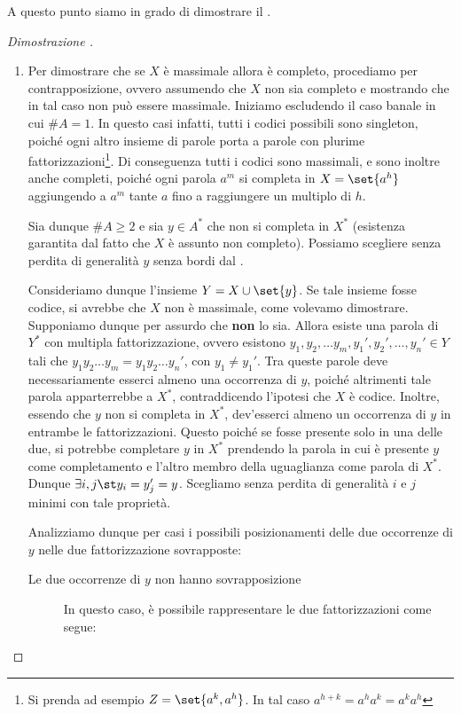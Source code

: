 A questo punto siamo in grado di dimostrare il .
\begin{proof}[Dimostrazione ]
  \begin{enumerate}
    \item Per dimostrare che se \(X\) è massimale allora è completo, procediamo per contrapposizione, ovvero assumendo che \(X\) non sia completo e mostrando che in tal caso non può essere massimale.
      Iniziamo escludendo il caso banale in cui \(\# A = 1\). In questo casi infatti, tutti i codici possibili sono singleton, poiché ogni altro insieme di parole porta a parole con plurime fattorizzazioni\footnote{Si prenda ad esempio \(Z = \set{a^k,a^h}\). In tal caso \(a^{h+k} = a^h a^k = a^k a^h\)}.
      Di conseguenza tutti i codici sono massimali, e sono inoltre anche completi, poiché ogni parola \(a^m\) si completa in \(X = \set{a^h}\) aggiungendo a \(a^m\) tante \(a\) fino a raggiungere un multiplo di \(h\).

      Sia dunque \(\# A \geq 2\) e sia \(y \in A^*\) che non si completa in \(X^*\) (esistenza garantita dal fatto che \(X\) è assunto non completo).
      Possiamo scegliere senza perdita di generalità \(y\) senza bordi dal .

      Consideriamo dunque l'insieme \(Y=X\cup\set{y}\). Se tale insieme fosse codice, si avrebbe che \(X\) non è massimale, come volevamo dimostrare.
      Supponiamo dunque per assurdo che \textbf{non} lo sia.
      Allora esiste una parola di \(Y^*\) con multipla fattorizzazione, ovvero esistono \(y_1,y_2,\ldots y_m,y_1',y_2',\ldots,y_n' \in Y\) tali che \(y_1y_2\ldots y_m = y_1y_2\ldots y_n'\), con \(y_1\neq y_1'\).
      Tra queste parole deve necessariamente esserci almeno una occorrenza di \(y\), poiché altrimenti tale parola apparterrebbe a \(X^*\), contraddicendo l'ipotesi che \(X\) è codice.
      Inoltre, essendo che \(y\) non si completa in \(X^*\), dev'esserci almeno un occorrenza di \(y\) in entrambe le fattorizzazioni.
      Questo poiché se fosse presente solo in una delle due, si potrebbe completare \(y\) in \(X^*\) prendendo la parola in cui è presente \(y\) come completamento e l'altro membro della uguaglianza come parola di \(X^*\).
      Dunque \(\exists i,j \st y_i=y_j'=y\). Scegliamo senza perdita di generalità \(i\) e \(j\) minimi con tale proprietà.

      Analizziamo dunque per casi i possibili posizionamenti delle due occorrenze di \(y\) nelle due fattorizzazione sovrapposte:
      \begin{description}
        \item[Le due occorrenze di \(y\) non hanno sovrapposizione]
          In questo caso, è possibile rappresentare le due fattorizzazioni come segue:
          \begin{figure}[H]
            \centering
\end{figure}
\end{description}
\end{enumerate}
\end{proof}
